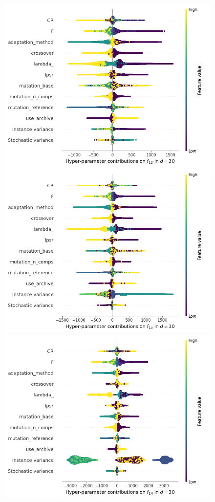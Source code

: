 \begin{figure}[t]
	\includegraphics[height=0.15\textheight,trim=60mm 0mm 0mm 0mm,clip]{de_img_new/img_summary_f12_d30.png}
	\includegraphics[height=0.15\textheight,trim=0mm 0mm 30mm 0mm,clip]{de_img_new/img_summary_f13_d30.png}
	\includegraphics[height=0.15\textheight,trim=60mm 0mm 30mm 0mm,clip]{de_img_new/img_summary_f14_d30.png}

\end{figure}
